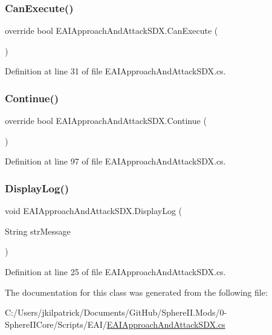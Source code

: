 \subsubsection{\texorpdfstring{CanExecute()}{CanExecute()}}
{\footnotesize\ttfamily override bool E\+A\+I\+Approach\+And\+Attack\+S\+D\+X.\+Can\+Execute (\begin{DoxyParamCaption}{ }\end{DoxyParamCaption})}



Definition at line 31 of file E\+A\+I\+Approach\+And\+Attack\+S\+D\+X.\+cs.

\mbox{\label{class_e_a_i_approach_and_attack_s_d_x_a9f3130a32e9a3b52e6edd4c5d13ab5f2}} 
\subsubsection{\texorpdfstring{Continue()}{Continue()}}
{\footnotesize\ttfamily override bool E\+A\+I\+Approach\+And\+Attack\+S\+D\+X.\+Continue (\begin{DoxyParamCaption}{ }\end{DoxyParamCaption})}



Definition at line 97 of file E\+A\+I\+Approach\+And\+Attack\+S\+D\+X.\+cs.

\mbox{\label{class_e_a_i_approach_and_attack_s_d_x_a873a0f9cf095c391535442e11cb9fc2c}} 
\subsubsection{\texorpdfstring{DisplayLog()}{DisplayLog()}}
{\footnotesize\ttfamily void E\+A\+I\+Approach\+And\+Attack\+S\+D\+X.\+Display\+Log (\begin{DoxyParamCaption}\item[{String}]{str\+Message }\end{DoxyParamCaption})}



Definition at line 25 of file E\+A\+I\+Approach\+And\+Attack\+S\+D\+X.\+cs.



The documentation for this class was generated from the following file\+:\begin{DoxyCompactItemize}
\item 
C\+:/\+Users/jkilpatrick/\+Documents/\+Git\+Hub/\+Sphere\+I\+I.\+Mods/0-\/\+Sphere\+I\+I\+Core/\+Scripts/\+E\+A\+I/\mbox{\hyperlink{_e_a_i_approach_and_attack_s_d_x_8cs}{E\+A\+I\+Approach\+And\+Attack\+S\+D\+X.\+cs}}\end{DoxyCompactItemize}
